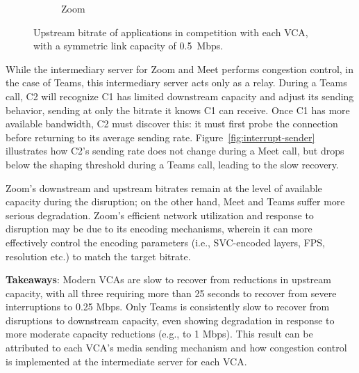 \begin{figure}[t!]
\begin{subfigure}[t]{.33\textwidth}
        \caption{Zoom}
        \label{fig:zoom_ul_box}
    \end{subfigure}
    \caption{Upstream bitrate of applications in competition with each VCA, with a symmetric link capacity of 0.5~Mbps.}
    \label{fig:boxplot-upld}
\end{figure}

While the intermediary server for Zoom and Meet performs congestion control,
in the case of Teams, this intermediary server acts only as a relay. During a
Teams call, C2 will recognize C1 has limited downstream capacity and adjust
its sending behavior, sending at only the bitrate it knows C1 can receive.
Once C1 has more available bandwidth, C2 must discover this: it must first
probe the connection before returning to its average sending rate.
Figure~\ref{fig:interrupt-sender} illustrates how C2's sending rate does not
change during a Meet call, but drops below the shaping threshold during a
Teams call, leading to the slow recovery.

Zoom's downstream and upstream bitrates remain at the level of available
capacity during the disruption; on the other hand, Meet and Teams suffer more
serious degradation. Zoom's efficient network utilization and response to
disruption may be due to its encoding mechanisms, wherein it can more
effectively control the encoding parameters (i.e., SVC-encoded layers, FPS,
resolution etc.) to match the target bitrate.  

\begin{mdframed}[roundcorner=5pt, backgroundcolor=black!10] \noindent
    \textbf{Takeaways}: Modern VCAs are slow to recover from reductions in upstream 
    capacity, with all three requiring more than 25 seconds to recover from severe
    interruptions to 0.25 Mbps. Only Teams is consistently slow to recover
    from disruptions to downstream capacity, even showing degradation in
    response to more moderate capacity reductions (e.g., to 1 Mbps).
    This result can be attributed to each VCA's media sending mechanism and how
    congestion control is implemented at the intermediate server for each VCA. 
\end{mdframed}


